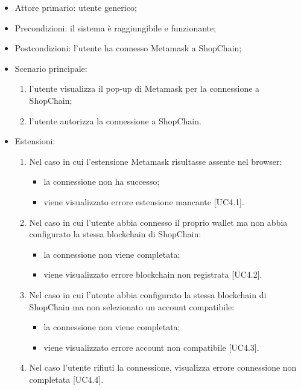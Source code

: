 \begin{itemize}
    \item Attore primario: utente generico;
    \item Precondizioni: il sistema è raggiungibile e funzionante;
    \item Postcondizioni: l'utente ha connesso Metamask a ShopChain;
    \item Scenario principale:
    \begin{enumerate}
        \item l'utente visualizza il pop-up di Metamask per la connessione a ShopChain;
        \item l'utente autorizza la connessione a ShopChain.
    \end{enumerate}
    \item Estensioni:
    \begin{enumerate}
        \item Nel caso in cui l'estensione Metamask risultasse assente nel browser:
        \begin{itemize}
            \item la connessione non ha successo;
            \item viene visualizzato errore estensione mancante [UC4.1].
        \end{itemize}
        \item Nel caso in cui l'utente abbia connesso il proprio wallet ma non abbia configurato la stessa blockchain di ShopChain:
        \begin{itemize}
            \item la connessione non viene completata;
            \item viene visualizzato errore blockchain non registrata [UC4.2].
        \end{itemize}
        \item Nel caso in cui l'utente abbia configurato la stessa blockchain di ShopChain ma non selezionato un account compatibile:
        \begin{itemize}
            \item la connessione non viene completata;
            \item viene visualizzato errore account non compatibile [UC4.3].
        \end{itemize}
        \item Nel caso l'utente rifiuti la connessione, visualizza errore connessione non completata [UC4.4].
    \end{enumerate}
\end{itemize}

